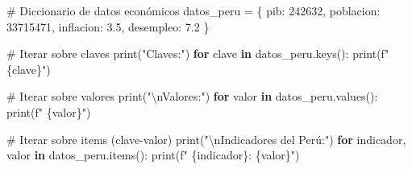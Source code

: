 \documentclass[
  doc,
  floatsintext,
  longtable,
  a4paper,
  nolmodern,
  notxfonts,
  notimes,
  12pt,
  colorlinks=true,linkcolor=blue,citecolor=blue,urlcolor=blue]{apa7}
\newenvironment{Shaded}{\begin{snugshade}}{\end{snugshade}}
\newcommand{\BuiltInTok}[1]{\textcolor[rgb]{0.00,0.23,0.31}{#1}}
\newcommand{\CharTok}[1]{\textcolor[rgb]{0.13,0.47,0.30}{#1}}
\newcommand{\CommentTok}[1]{\textcolor[rgb]{0.37,0.37,0.37}{#1}}
\newcommand{\ControlFlowTok}[1]{\textcolor[rgb]{0.00,0.23,0.31}{\textbf{#1}}}
\newcommand{\DecValTok}[1]{\textcolor[rgb]{0.68,0.00,0.00}{#1}}
\newcommand{\FloatTok}[1]{\textcolor[rgb]{0.68,0.00,0.00}{#1}}
\newcommand{\KeywordTok}[1]{\textcolor[rgb]{0.00,0.23,0.31}{\textbf{#1}}}
\newcommand{\NormalTok}[1]{\textcolor[rgb]{0.00,0.23,0.31}{#1}}
\newcommand{\OperatorTok}[1]{\textcolor[rgb]{0.37,0.37,0.37}{#1}}
\newcommand{\SpecialCharTok}[1]{\textcolor[rgb]{0.37,0.37,0.37}{#1}}
\newcommand{\SpecialStringTok}[1]{\textcolor[rgb]{0.13,0.47,0.30}{#1}}
\newcommand{\StringTok}[1]{\textcolor[rgb]{0.13,0.47,0.30}{#1}}
\begin{document}
\begin{Shaded}
\begin{Highlighting}[]
\CommentTok{\# Diccionario de datos económicos}
\NormalTok{datos\_peru }\OperatorTok{=}\NormalTok{ \{}
    \StringTok{\textquotesingle{}pib\textquotesingle{}}\NormalTok{: }\DecValTok{242632}\NormalTok{,}
    \StringTok{\textquotesingle{}poblacion\textquotesingle{}}\NormalTok{: }\DecValTok{33715471}\NormalTok{,}
    \StringTok{\textquotesingle{}inflacion\textquotesingle{}}\NormalTok{: }\FloatTok{3.5}\NormalTok{,}
    \StringTok{\textquotesingle{}desempleo\textquotesingle{}}\NormalTok{: }\FloatTok{7.2}
\NormalTok{\}}

\CommentTok{\# Iterar sobre claves}
\BuiltInTok{print}\NormalTok{(}\StringTok{"Claves:"}\NormalTok{)}
\ControlFlowTok{for}\NormalTok{ clave }\KeywordTok{in}\NormalTok{ datos\_peru.keys():}
    \BuiltInTok{print}\NormalTok{(}\SpecialStringTok{f"  }\SpecialCharTok{\{}\NormalTok{clave}\SpecialCharTok{\}}\SpecialStringTok{"}\NormalTok{)}

\CommentTok{\# Iterar sobre valores}
\BuiltInTok{print}\NormalTok{(}\StringTok{"}\CharTok{\textbackslash{}n}\StringTok{Valores:"}\NormalTok{)}
\ControlFlowTok{for}\NormalTok{ valor }\KeywordTok{in}\NormalTok{ datos\_peru.values():}
    \BuiltInTok{print}\NormalTok{(}\SpecialStringTok{f"  }\SpecialCharTok{\{}\NormalTok{valor}\SpecialCharTok{\}}\SpecialStringTok{"}\NormalTok{)}

\CommentTok{\# Iterar sobre items (clave{-}valor)}
\BuiltInTok{print}\NormalTok{(}\StringTok{"}\CharTok{\textbackslash{}n}\StringTok{Indicadores del Perú:"}\NormalTok{)}
\ControlFlowTok{for}\NormalTok{ indicador, valor }\KeywordTok{in}\NormalTok{ datos\_peru.items():}
    \BuiltInTok{print}\NormalTok{(}\SpecialStringTok{f"  }\SpecialCharTok{\{}\NormalTok{indicador}\SpecialCharTok{\}}\SpecialStringTok{: }\SpecialCharTok{\{}\NormalTok{valor}\SpecialCharTok{\}}\SpecialStringTok{"}\NormalTok{)}


\end{Highlighting}
\end{Shaded}
\end{document}
